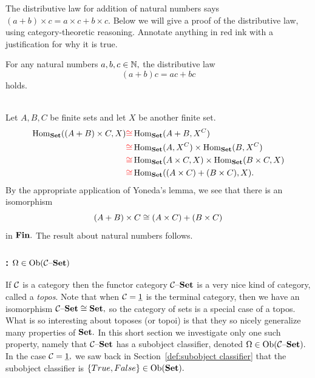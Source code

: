 \documentclass[CT4S-EN-RU]{subfiles}
\begin{document}
\begin{exerciseENG}
The distributive law for addition of natural numbers says $(a+b)\times c=a\times c+b\times c.$ Below we will give a proof of the distributive law, using category-theoretic reasoning. Annotate anything in {\color{red}red} ink  with a justification for why it is true.
\begin{propositionENG}
For any natural numbers $a,b,c\in{\mathbb N},$ the distributive law 
$$(a+b)c=ac+bc$$ 
holds.
\end{propositionENG}
\begin{proofENG}
~\\
Let $A,B,C$ be finite sets and let $X$ be another finite set.
\begin{align*}
\operatorname{Hom}_{\mathbf{Set}}((A+B)\times C,X)
&{\color{red}\cong}\operatorname{Hom}_{\mathbf{Set}}(A+B,X^C)\\
&{\color{red}\cong}\operatorname{Hom}_{\mathbf{Set}}(A,X^C)\times\operatorname{Hom}_{\mathbf{Set}}(B,X^C)\\
&{\color{red}\cong}\operatorname{Hom}_{\mathbf{Set}}(A\times C,X)\times\operatorname{Hom}_{\mathbf{Set}}(B\times C,X)\\
&{\color{red}\cong}\operatorname{Hom}_{\mathbf{Set}}((A\times C)+(B\times C),X).
\end{align*}
By {\color{red} the appropriate application} of Yoneda's lemma, we see that there is an isomorphism
$$(A+B)\times C\cong(A\times C)+(B\times C)$$
in ${\mathbf{Fin}}.$ The result about natural numbers {\color{red}follows}.
\end{proofENG}
\end{exerciseENG}

\begin{exerciseRUS}
\begin{propositionRUS}
\end{propositionRUS}
\begin{proofRUS}
\end{proofRUS}
\end{exerciseRUS}


\subsubsection{: \texorpdfstring{$\Omega\in\operatorname{Ob}(\mathcal{C}{\text \textendash}{\mathbf{Set}})$}{Ω∈Ob(C-Set)}}

\begin{blockENG}
If $\mathcal{C}$ is a category then the functor category $\mathcal{C}{\text \textendash}{\mathbf{Set}}$ is a very nice kind of category, called a {\em topos}. Note that when $\mathcal{C}=\underline{1}$ is the terminal category, then we have an isomorphism $\mathcal{C}{\text \textendash}{\mathbf{Set}}\cong{\mathbf{Set}},$ so the category of sets is a special case of a topos. What is so interesting about toposes (or topoi) is that they so nicely generalize many properties of ${\mathbf{Set}}.$ In this short section we investigate only one such property, namely that $\mathcal{C}{\text \textendash}{\mathbf{Set}}$ has a subobject classifier, denoted $\Omega\in\operatorname{Ob}(\mathcal{C}{\text \textendash}{\mathbf{Set}}).$ In the case $\mathcal{C}=\underline{1},$ we saw back in Section~\ref{def:subobject classifier} that the subobject classifier is $\{True,False\}\in\operatorname{Ob}({\mathbf{Set}}).$ 
\end{blockENG}
\end{document}
